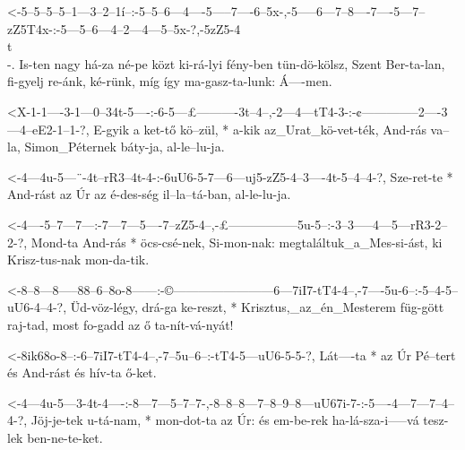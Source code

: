 
  {<-5--5--5--5--1---3--2--1í--:-5--5--6---4----5-----7----6--5x-,-5-----6---7--8----7----5---7--zZ5T4x-:-5---5--6---4--2---4---5--5x-?,-5zZ5-4\\t\\-.}
  {  Is-ten nagy há-za né-pe közt ki-rá-lyi fény-ben tün-dö-kölsz, Szent Ber-ta-lan, fi-gyelj re-ánk, ké-rünk, míg így ma-gasz-ta-lunk:  Á----men.}




  {<X-1-1----3-1---0--34t-5----:-6-5---£----------3t--4--,-2---4---tT4-3-:-¢--------------2----3---4--eE2-1--1-?,}
  {   E-gyik a ket-tő kö--zül, * a-kik az_Urat_kö-vet-ték, And-rás va--la, Simon_Péternek báty-ja, al-le--lu-ja.}

  {<-4---4u-5---¨-4t--rR3--4t-4-:-6uU6-5-7---6---uj5-zZ5-4--3----4t-5--4--4-?,}
  {  Sze-ret-te * And-rást az Úr  az   é-des-ség il--la--tá-ban, al-le-lu-ja.}

  {<-4----5--7---7---:-7---7---5----7--zZ5-4--,-£-----------------5u-5--:-3--3-----4---5---rR3-2--2-?,}
  {  Mond-ta And-rás * öcs-csé-nek, Si-mon-nak: megtaláltuk_a_Mes-si-ást, ki Krisz-tus-nak mon-da-tik.}

  {<-8--8---8-----88--6--8o-8------:-©------------------------6---7iI7-tT4-4--,-7----5u-6--:-5--4-5--uU6-4--4-?,}
  {  Üd-vöz-légy, drá-ga ke-reszt, * Krisztus,_az_én_Mesterem füg-gött raj-tad, most fo-gadd az ő ta-nít-vá-nyát!}


  {<-8ik68o-8--:-6--7iI7-tT4-4--,-7--5u--6--:-tT4-5---uU6-5-5-?,}
  {  Lát----ta * az Úr   Pé--tert és And-rást és  hív-ta  ő-ket.}

  {<-4---4u-5---3-4t-4----:-8---7---5--7--7-,-8--8--8---7--8--9--8---uU67i-7-:-5----4---7---7--4--4-?,}
  {  Jöj-je-tek u-tá-nam, * mon-dot-ta az Úr: és em-be-rek ha-lá-sza-i-----vá  tesz-lek ben-ne-te-ket.}


